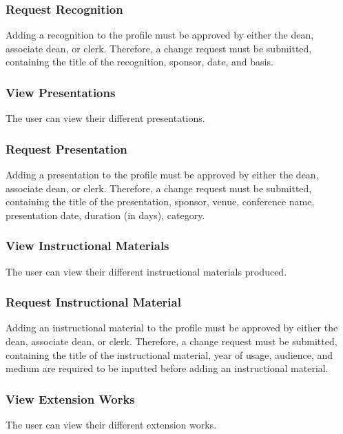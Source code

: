         \subsubsection{Request Recognition}
        Adding a recognition to the profile must be approved by either the dean, associate dean, or clerk. Therefore, a change request must be submitted, containing the title of the recognition, sponsor, date, and basis.
        
        \subsubsection{View Presentations}
        The user can view their different presentations.
        
        \subsubsection{Request Presentation}
        Adding a presentation to the profile must be approved by either the dean, associate dean, or clerk. Therefore, a change request must be submitted, containing the title of the presentation, sponsor, venue, conference name, presentation date, duration (in days), category.
        
        \subsubsection{View Instructional Materials}
        The user can view their different instructional materials produced.
        
        \subsubsection{Request Instructional Material}
        Adding an instructional material to the profile must be approved by either the dean, associate dean, or clerk. Therefore, a change request must be submitted, containing the title of the instructional material, year of usage, audience, and medium are required to be inputted before adding an instructional material.
        
        \subsubsection{View Extension Works}
        The user can view their different extension works.
        
